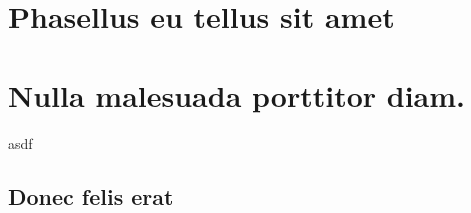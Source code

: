 \documentclass[a4paper,11pt,bcor=10mm,marginright]{tubsartcl}
\begin{document}
\section{Phasellus eu tellus sit amet}

\lipsum[2-5]

\section{Nulla malesuada porttitor diam.}

\lipsum[1-3]

\begin{gausspage}
  \begin{segment}[bgcolor=tuOrange]{2}
    \begin{tubsbox}[bgcolor=tuBlue]{1}{1}{3}{2}
      asdf
    \end{tubsbox}
  \end{segment}
\clearpage
\end{gausspage}


\subsection{Donec felis erat}

\lipsum[4-7]
\end{document}
